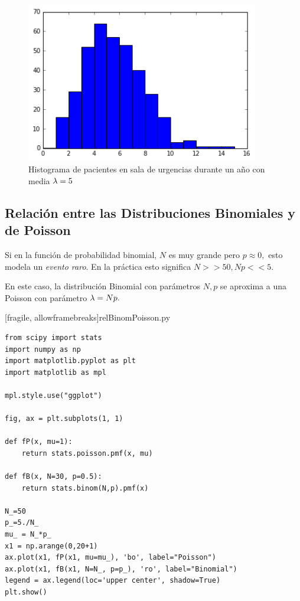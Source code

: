 \begin{figure}
 \centering
 \includegraphics[height=7cm,keepaspectratio=true]{./pe/distPoisson1.png}
 \caption{Histograma de pacientes en sala de urgencias durante un año con media $\lambda=5$}
 \label{fig:distPoisson1}
\end{figure}



\subsection{Relación entre las Distribuciones Binomiales y de Poisson}

 Si en la función de probabilidad binomial, $N$ es muy grande pero $p \approx 0,$ esto modela un \emph{evento raro}.  En la práctica esto significa $N>>50, Np<<5.$ 

 En este caso, la distribución Binomial con parámetros $N,p$ se aproxima a una Poisson con parámetro $\lambda = Np.$

[fragile, allowframebreaks]{relBinomPoisson.py}
 \begin{verbatim}
from scipy import stats
import numpy as np
import matplotlib.pyplot as plt
import matplotlib as mpl

mpl.style.use("ggplot")

fig, ax = plt.subplots(1, 1)

def fP(x, mu=1):
    return stats.poisson.pmf(x, mu)

def fB(x, N=30, p=0.5):
    return stats.binom(N,p).pmf(x)

N_=50
p_=5./N_
mu_ = N_*p_
x1 = np.arange(0,20+1)
ax.plot(x1, fP(x1, mu=mu_), 'bo', label="Poisson")
ax.plot(x1, fB(x1, N=N_, p=p_), 'ro', label="Binomial")
legend = ax.legend(loc='upper center', shadow=True)
plt.show()

 \end{verbatim}




